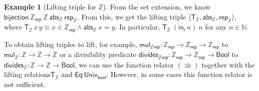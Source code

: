 \documentclass{article}
\theoremstyle{definition}
\newtheorem{example}[definition]{Example}
\newcommand{\bool}{\mathsf{Bool}}
\newcommand{\eq}{\mathsf{Eq}}
\newcommand{\bijection}{\mathsf{bijection}}
\newcommand{\univ}{\mathsf{Univ}}
\newcommand{\nat}{\mathbb{N}}
\newcommand{\inte}{\mathbb{Z}}
\newcommand{\abs}{\mathsf{abs}}
\newcommand{\rep}{\mathsf{rep}}
\newcommand{\relint}{\mathsf{T_\inte}}
\newcommand{\liftrels}{lifting relations\xspace}
\begin{document}
\begin{example}[Lifting triple for \(\inte\)]
From the set extension, we know \(\bijection\ \inte_{\rep}\ \inte\ \abs_\inte\ \rep_\inte\).
From this, we get the lifting triple \(\langle \relint, \abs_\inte, \rep_\inte \rangle\),
where \(\relint\, x\, y\equiv x \in \inte_{\rep} \land \abs_\inte\ x = y\).
In particular, \(\relint\ (\mathsf{in_l}\ n)\ n\) for any \(n \in \nat\).
\end{example}
To obtain lifting triples to lift, for example, \(\mathsf{mul_{\inte rep}} : \inte_{\rep} \rightarrow \inte_{\rep} \rightarrow \inte_{\rep}\) to \(\mathsf{mul_{\inte}} : \inte \rightarrow \inte \rightarrow \inte\)
or a divisibility predicate \(\mathsf{divides_{\inte rep}} : \inte_{\rep} \rightarrow \inte_{\rep} \rightarrow \bool\) to \(\mathsf{divides_{\inte}} : \inte \rightarrow \inte \rightarrow \bool\),
we can use the function relator \((\Rrightarrow)\)
together with the \liftrels \(\mathsf{T_\inte}\) and \(\eq\ \univ_{\mathsf{bool}}\).
However, in some cases this function relator is not sufficient.
\end{document}
